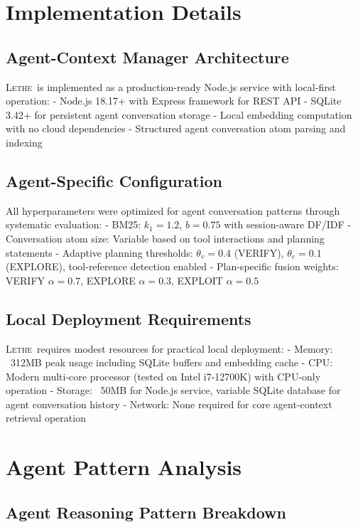 \documentclass[letterpaper]{article}
\newcommand{\lethe}{\textsc{Lethe}}
\begin{document}
\newpage
\appendix

\section{Implementation Details}

\subsection{Agent-Context Manager Architecture}

\lethe\ is implemented as a production-ready Node.js service with local-first operation:
- Node.js 18.17+ with Express framework for REST API
- SQLite 3.42+ for persistent agent conversation storage
- Local embedding computation with no cloud dependencies
- Structured agent conversation atom parsing and indexing

\subsection{Agent-Specific Configuration}

All hyperparameters were optimized for agent conversation patterns through systematic evaluation:
- BM25: $k_1 = 1.2$, $b = 0.75$ with session-aware DF/IDF  
- Conversation atom size: Variable based on tool interactions and planning statements
- Adaptive planning thresholds: $\theta_v = 0.4$ (VERIFY), $\theta_e = 0.1$ (EXPLORE), tool-reference detection enabled
- Plan-specific fusion weights: VERIFY $\alpha = 0.7$, EXPLORE $\alpha = 0.3$, EXPLOIT $\alpha = 0.5$

\subsection{Local Deployment Requirements}

\lethe\ requires modest resources for practical local deployment:
- Memory: ~312MB peak usage including SQLite buffers and embedding cache
- CPU: Modern multi-core processor (tested on Intel i7-12700K) with CPU-only operation
- Storage: ~50MB for Node.js service, variable SQLite database for agent conversation history
- Network: None required for core agent-context retrieval operation

\section{Agent Pattern Analysis}

\subsection{Agent Reasoning Pattern Breakdown}
\end{document}
